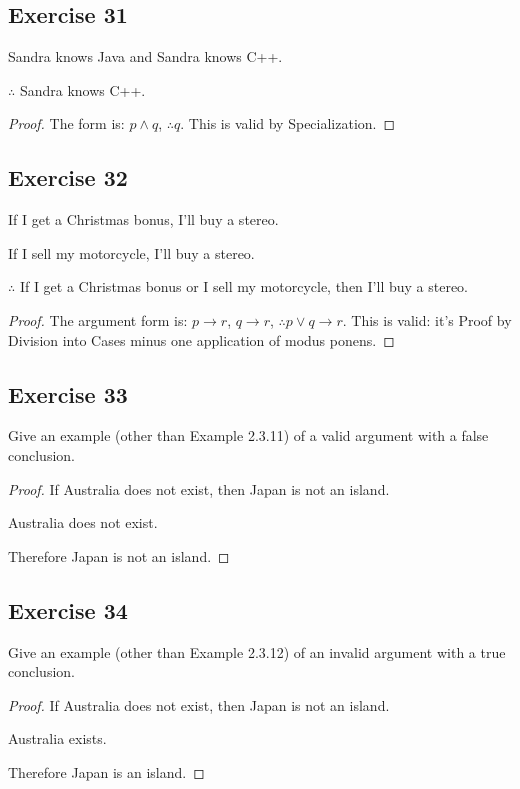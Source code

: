 \documentclass[14pt]{extarticle}
\begin{document}
\subsection{Exercise 31}
Sandra knows Java and Sandra knows C++.

$\therefore$ Sandra knows C++.

\begin{proof}
    The form is: $p \wedge q$, $\therefore q$. This is valid by Specialization.
\end{proof}

\subsection{Exercise 32}
If I get a Christmas bonus, I’ll buy a stereo.

If I sell my motorcycle, I’ll buy a stereo.

$\therefore$ If I get a Christmas bonus or I sell my motorcycle, then I’ll buy a stereo.

\begin{proof}
    The argument form is: $p \to r$, $q \to r$, $\therefore p \vee q \to r$. This is valid: it's Proof by Division into Cases minus one application of modus ponens.
\end{proof}

\subsection{Exercise 33}
Give an example (other than Example 2.3.11) of a valid argument with a false conclusion.

\begin{proof}
    If Australia does not exist, then Japan is not an island.

    Australia does not exist.

    Therefore Japan is not an island.
\end{proof}

\subsection{Exercise 34}
Give an example (other than Example 2.3.12) of an invalid argument with a true conclusion.

\begin{proof}
    If Australia does not exist, then Japan is not an island.

    Australia exists.

    Therefore Japan is an island.
\end{proof}
\end{document}
